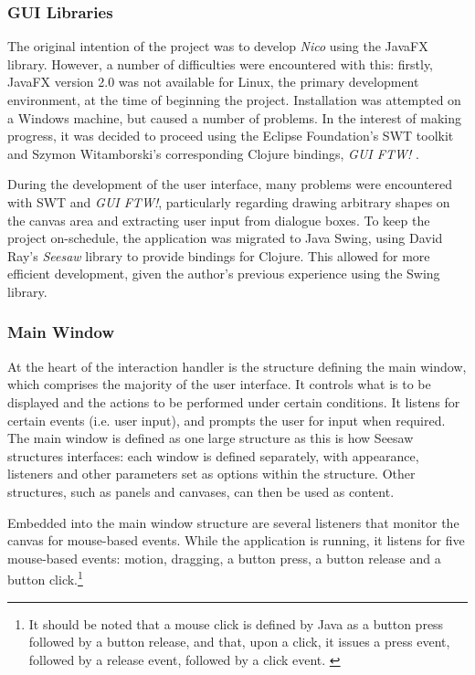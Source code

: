 \documentclass[12pt,twoside,notitlepage,xetex]{report}
\begin{document}
\subsubsection{GUI Libraries}

The original intention of the project was to develop \emph{Nico} using the JavaFX library. However, a number of difficulties were encountered with this: firstly, JavaFX version 2.0 was not available for Linux, the primary development environment, at the time of beginning the project.  Installation was attempted on a Windows machine, but caused a number of problems. In the interest of making progress, it was decided to proceed using the Eclipse Foundation's SWT toolkit and Szymon Witamborski's corresponding Clojure bindings, \emph{GUI FTW!} \cite{GuiFtw}.

During the development of the user interface, many problems were encountered with SWT and \emph{GUI FTW!}, particularly regarding drawing arbitrary shapes on the canvas area and extracting user input from dialogue boxes.  To keep the project on-schedule, the application was migrated to Java Swing, using David Ray's \emph{Seesaw} library to provide bindings for Clojure. \cite{Seesaw}  This allowed for more efficient development, given the author's previous experience using the Swing library.

\subsubsection{Main Window}

At the heart of the interaction handler is the structure defining the main window, which comprises the majority of the user interface.  It controls what is to be displayed and the actions to be performed under certain conditions.  It listens for certain events (i.e. user input), and prompts the user for input when required.  The main window is defined as one large structure as this is how Seesaw structures interfaces: each window is defined separately, with appearance, listeners and other parameters set as options within the structure.  Other structures, such as panels and canvases, can then be used as content.

Embedded into the main window structure are several listeners that monitor the canvas for mouse-based events.  While the application is running, it listens for five mouse-based events: motion, dragging, a button press, a button release and a button click.\footnote{It should be noted that a mouse click is defined by Java as a button press followed by a button release, and that, upon a click, it issues a press event, followed by a release event, followed by a click event. \cite{JavaApi}}
\end{document}
